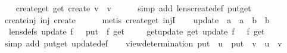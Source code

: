 \begin{isabellebody}
\isanewline
\isanewline
\ \ \isamarkupfalse%
\ create{\isacharunderscore}get{\isacharcolon}\ {\isachardoublequoteopen}get\ {\isacharparenleft}create\ v{\isacharparenright}\ {\isacharequal}\ v{\isachardoublequoteclose}\isanewline
%
\isadelimproof
\ \ \ \ %
\endisadelimproof
%
\isatagproof
{}\isamarkupfalse%
\ {\isacharparenleft}simp\ add{\isacharcolon}\ lens{\isacharunderscore}create{\isacharunderscore}def\ put{\isacharunderscore}get{\isacharparenright}%
\endisatagproof
{\isafoldproof}%
%
\isadelimproof
\isanewline
%
\endisadelimproof
\isanewline
\ \ \isamarkupfalse%
\ create{\isacharunderscore}inj{\isacharcolon}\ {\isachardoublequoteopen}inj\ create{\isachardoublequoteclose}\isanewline
%
\isadelimproof
\ \ \ \ %
\endisadelimproof
%
\isatagproof
{}\isamarkupfalse%
\ {\isacharparenleft}metis\ create{\isacharunderscore}get\ injI{\isacharparenright}%
\endisatagproof
{\isafoldproof}%
%
\isadelimproof
\isanewline
%
\endisadelimproof
\isanewline
\ \ \isamarkupfalse%
\ update\ {\isacharcolon}{\isacharcolon}\ {\isachardoublequoteopen}{\isacharparenleft}{\isacharprime}a\ {\isasymRightarrow}\ {\isacharprime}a{\isacharparenright}\ {\isasymRightarrow}\ {\isacharparenleft}{\isacharprime}b\ {\isasymRightarrow}\ {\isacharprime}b{\isacharparenright}{\isachardoublequoteclose}\ \isanewline
\ \ {\isacharbrackleft}lens{\isacharunderscore}defs{\isacharbrackright}{\isacharcolon}\ {\isachardoublequoteopen}update\ f\ {\isasymsigma}\ {\isacharequal}\ put\ {\isasymsigma}\ {\isacharparenleft}f\ {\isacharparenleft}get\ {\isasymsigma}{\isacharparenright}{\isacharparenright}{\isachardoublequoteclose}\isanewline
\isanewline
\ \ \isamarkupfalse%
\ get{\isacharunderscore}update{\isacharcolon}\ {\isachardoublequoteopen}get\ {\isacharparenleft}update\ f\ {\isasymsigma}{\isacharparenright}\ {\isacharequal}\ f\ {\isacharparenleft}get\ {\isasymsigma}{\isacharparenright}{\isachardoublequoteclose}\isanewline
%
\isadelimproof
\ \ \ \ %
\endisadelimproof
%
\isatagproof
{}\isamarkupfalse%
\ {\isacharparenleft}simp\ add{\isacharcolon}\ put{\isacharunderscore}get\ update{\isacharunderscore}def{\isacharparenright}%
\endisatagproof
{\isafoldproof}%
%
\isadelimproof
\isanewline
%
\endisadelimproof
\isanewline
\ \ \isamarkupfalse%
\ view{\isacharunderscore}determination{\isacharcolon}\ {\isachardoublequoteopen}put\ {\isasymsigma}\ u\ {\isacharequal}\ put\ {\isasymrho}\ v\ {\isasymLongrightarrow}\ u\ {\isacharequal}\ v{\isachardoublequoteclose}\isanewline

\end{isabellebody}
